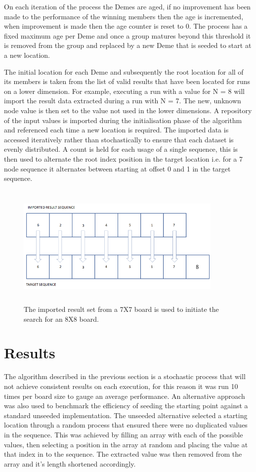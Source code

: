 \documentclass[conference]{IEEEtran}
\begin{document}
On each iteration of the process the Demes are aged, if no improvement has been made to the performance of the winning members then the age is incremented, when improvement is made then the age counter is reset to 0. The process has a fixed maximum age per Deme and once a group matures beyond this threshold it is removed from the group and replaced by a new Deme that is seeded to start at a new location.

The initial location for each Deme and subsequently the root location for all of its members is taken from the list of valid results that have been located for runs on a lower dimension. For example, executing a run with a value for N = 8 will import the result data extracted during a run with N = 7. The new, unknown node value is then set to the value not used in the lower dimensions. A repository of the input values is imported during the initialisation phase of the algorithm and referenced each time a new location is required. The imported data is accessed iteratively rather than stochastically to ensure that each dataset is evenly distributed. A count is held for each usage of a single sequence, this is then used to alternate the root index position in the target location i.e. for a 7 node sequence it alternates between starting at offset 0 and 1 in the target sequence.

\begin{figure}[!htbp]
	\centering	
	\includegraphics[width=10cm, height=6cm]{ImportSequence}
	\caption{The imported result set from a 7X7 board is used to initiate the search for an 8X8 board.}
\end{figure}

\section{Results}
The algorithm described in the previous section is a stochastic process that will not achieve consistent results on each execution, for this reason it was run 10 times per board size to gauge an average performance. An alternative approach was also used to benchmark the efficiency of seeding the starting point against a standard unseeded implementation. The unseeded alternative selected a starting location through a random process that ensured there were no duplicated values in the sequence. This was achieved by filling an array with each of the possible values, then selecting a position in the array at random and placing the value at that index in to the sequence. The extracted value was then removed from the array and it's length shortened accordingly.
\end{document}
